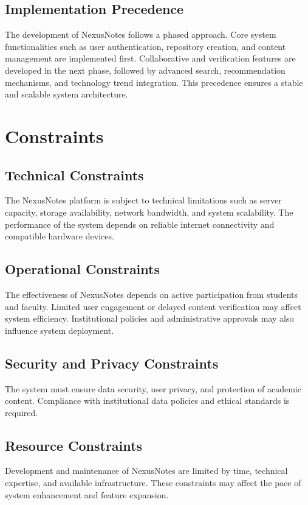 \documentclass[12pt,a4paper]{report}
\begin{document}
\section{Implementation Precedence}
The development of NexusNotes follows a phased approach. Core system functionalities such as user authentication, repository creation, and content management are implemented first. Collaborative and verification features are developed in the next phase, followed by advanced search, recommendation mechanisms, and technology trend integration. This precedence ensures a stable and scalable system architecture.

\chapter{Constraints}

\section{Technical Constraints}
The NexusNotes platform is subject to technical limitations such as server capacity, storage availability, network bandwidth, and system scalability. The performance of the system depends on reliable internet connectivity and compatible hardware devices.

\section{Operational Constraints}
The effectiveness of NexusNotes depends on active participation from students and faculty. Limited user engagement or delayed content verification may affect system efficiency. Institutional policies and administrative approvals may also influence system deployment.

\section{Security and Privacy Constraints}
The system must ensure data security, user privacy, and protection of academic content. Compliance with institutional data policies and ethical standards is required.

\section{Resource Constraints}
Development and maintenance of NexusNotes are limited by time, technical expertise, and available infrastructure. These constraints may affect the pace of system enhancement and feature expansion.
\end{document}
